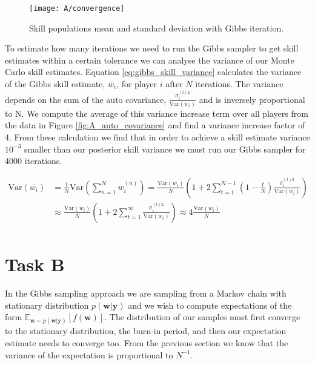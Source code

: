 \documentclass[11pt]{article}
\begin{document}
\begin{figure}[h]
    \centering
    \texttt{[image: A/convergence]} 
    \caption{Skill populations mean and standard deviation with Gibbs iteration.}
    \label{fig:A_convergence}
\end{figure}

To estimate how many iterations we need to run the Gibbs sampler to get skill estimates within a certain tolerance we can analyse the variance of our Monte Carlo skill estimates. Equation \ref{eq:gibbs_skill_variance} calculates the variance of the Gibbs skill estimate, $\bar{w_i}$, for player $i$ after $N$ iterations. The variance depends on the sum of the auto covariance, $\frac{\sigma_i^{(t)2}}{\text{Var}(w_i)}$ and is inversely proportional to N. We compute the average of this variance increase term over all players from the data in Figure \ref{fig:A_auto_covariance} and find a variance increase factor of 4. From these calculation we find that in order to achieve a skill estimate variance $10^{-3}$ smaller than our posterior skill variance we must run our Gibbs sampler for 4000 iterations.

\begin{equation}
    \begin{split}
    \text{Var}(\bar{w_i}) &= \frac{1}{N} \text{Var}(\sum_{n=1}^{N} w_i^{(n)}) = \frac{\text{Var}(w_i)}{N} (1 + 2 \sum_{t=1}^{N-1} (1-\frac{t}{N}) \frac{\sigma_i^{(t)2}}{\text{Var}(w_i)}) \\
     &\approx \frac{\text{Var}(w_i)}{N} (1 + 2 \sum_{t=1}^{\infty} \frac{\sigma_i^{(t)2}}{\text{Var}(w_i)}) \approx 4\frac{\text{Var}(w_i)}{N}\\
    \end{split}
    \label{eq:gibbs_skill_variance}
\end{equation}

\section{Task B}

In the Gibbs sampling approach we are sampling from a Markov chain with stationary distribution $p(\mathbf{w}|\mathbf{y})$ and we wish to compute expectations of the form $\mathbb{E}_{\mathbf{w} \sim p(\mathbf{w}|\mathbf{y})}[f(\mathbf{w})]$. The distribution of our samples must first converge to the stationary distribution, the burn-in period, and then our expectation estimate needs to converge too. From the previous section we know that the variance of the expectation is proportional to $N^{-1}$.
\end{document}

